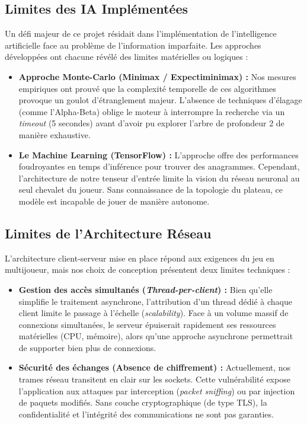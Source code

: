 \documentclass[a4paper]{article}
\begin{document}
	\subsection{Limites des IA Implémentées}
	Un défi majeur de ce projet résidait dans l'implémentation de l'intelligence artificielle face au problème de l'information imparfaite. Les approches développées ont chacune révélé des limites matérielles ou logiques :
	\begin{itemize}
		\item \textbf{Approche Monte-Carlo (Minimax / Expectiminimax) :} Nos mesures empiriques ont prouvé que la complexité temporelle de ces algorithmes provoque un goulot d'étranglement majeur. L'absence de techniques d'élagage (comme l'Alpha-Beta) oblige le moteur à interrompre la recherche via un \textit{timeout} (5 secondes) avant d'avoir pu explorer l'arbre de profondeur 2 de manière exhaustive.
		\item \textbf{Le Machine Learning (TensorFlow) :} L'approche offre des performances foudroyantes en temps d'inférence pour trouver des anagrammes. Cependant, l'architecture de notre tenseur d'entrée limite la vision du réseau neuronal au seul chevalet du joueur. Sans connaissance de la topologie du plateau, ce modèle est incapable de jouer de manière autonome.
	\end{itemize}

    \subsection{Limites de l'Architecture Réseau}
    L'architecture client-serveur mise en place répond aux exigences du jeu en multijoueur, mais nos choix de conception présentent deux limites techniques :
    \begin{itemize}
        \item \textbf{Gestion des accès simultanés (\textit{Thread-per-client}) :} Bien qu'elle simplifie le traitement asynchrone, l'attribution d'un thread dédié à chaque client limite le passage à l'échelle (\textit{scalability}). Face à un volume massif de connexions simultanées, le serveur épuiserait rapidement ses ressources matérielles (CPU, mémoire), alors qu’une approche asynchrone permettrait de supporter bien plus de connexions.
        \item \textbf{Sécurité des échanges (Absence de chiffrement) :} Actuellement, nos trames réseau transitent en clair sur les sockets. Cette vulnérabilité expose l'application aux attaques par interception (\textit{packet sniffing}) ou par injection de paquets modifiés. Sans couche cryptographique (de type TLS), la confidentialité et l'intégrité des communications ne sont pas garanties.
    \end{itemize}
\end{document}
